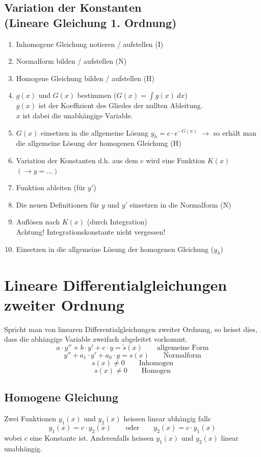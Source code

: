 \subsection{Variation der Konstanten \\(Lineare Gleichung 1. Ordnung)}
\begin{enumerate}
  \item Inhomogene Gleichung notieren / aufstellen (I)
  \item Normalform bilden / aufstellen (N)
  \item Homogene Gleichung bilden / aufstellen (H)
  \item $g(x)$ und $G(x)$ bestimmen ($G(x) = \int g(x) ~ dx$) \\
        $g(x)$ ist der Koeffizient des Gliedes der nullten Ableitung. \\
        $x$ ist dabei die unabhängige Variable. 
  \item $G(x)$ einsetzen in die allgemeine Lösung $y_h=c \cdot e^{-G(x)}$
        $\rightarrow$ so erhält man die allgemeine Lösung der 
        homogenen Gleichung (H)
  \item Variation der Konstanten d.h. aus dem c wird eine Funktion $K(x)$ 
        $(\rightarrow y= \ldots)$
  \item Funktion ableiten (für $y'$)
  \item Die neuen Definitionen für $y$ und $y'$ einsetzen in die Normalform (N) 
  \item Auflösen nach $K(x)$ (durch Integration) \\
        Achtung! Integrationskonstante nicht vergessen! 
  \item Einsetzen in die allgemeine Lösung der homogenen Gleichung ($y_h$)
\end{enumerate}

\newpage

\section{Lineare Differentialgleichungen zweiter Ordnung}
Spricht man von linearen Differentialgleichungen zweiter Ordnung, 
so heisst dies, dass die abhängige Variable zweifach abgeleitet
vorkommt.
\[ a\cdot y'' + b \cdot y' + c \cdot y = \tilde{s}(x) 
   \qquad \text{allgemeine Form}\]
\[ y'' + a_1 \cdot y' + a_0 \cdot y = s(x) 
   \qquad \text{Normalform}\]
   \[  s(x) \neq 0 \qquad \text{Inhomogen} \]
   \[  s(x) \neq 0 \qquad \text{Homogen} \]

\subsection{Homogene Gleichung}
Zwei Funktionen $y_1(x)$ und $y_2(x)$ heissen linear abhängig falls
\[ y_1(x)=c \cdot y_2(x) \qquad \text{oder} \qquad y_2(x)=c \cdot y_1(x) \]
wobei $c$ eine Konstante ist. Anderenfalls heissen $y_1(x)$ und $y_2(x)$
linear unabhängig.

